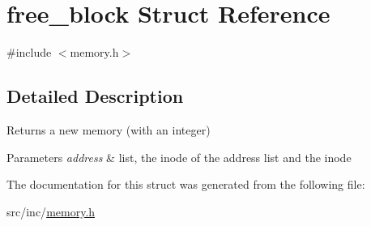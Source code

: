 \hypertarget{structfree__block}{}\section{free\+\_\+block Struct Reference}
\label{structfree__block}


{\ttfamily \#include $<$memory.\+h$>$}



\subsection{Detailed Description}
\begin{DoxyReturn}{Returns}
a new memory (with an integer) 
\end{DoxyReturn}

\begin{DoxyParams}{Parameters}
{\em address} & list, the inode of the address list and the inode \\
\hline
\end{DoxyParams}


The documentation for this struct was generated from the following file\+:\begin{DoxyCompactItemize}
\item 
src/inc/\mbox{\hyperlink{memory_8h}{memory.\+h}}\end{DoxyCompactItemize}
